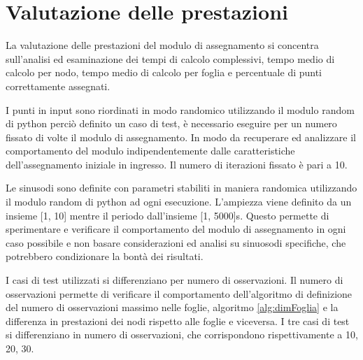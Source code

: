 \documentclass[a4paper,12pt]{report}
\begin{document}
\section{Valutazione delle prestazioni}
La valutazione delle prestazioni del modulo di assegnamento si concentra sull'analisi ed esaminazione dei tempi di calcolo complessivi, tempo medio di calcolo per nodo, tempo medio di calcolo per foglia e percentuale di punti correttamente assegnati.

I punti in input sono riordinati in modo randomico utilizzando il modulo random di python perciò definito un caso di test, è necessario eseguire per un numero fissato di volte il modulo di assegnamento. In modo da recuperare ed analizzare il comportamento del modulo indipendentemente dalle caratteristiche dell'assegnamento iniziale in ingresso. Il numero di iterazioni fissato è pari a 10.

Le sinusodi sono definite con parametri stabiliti in maniera randomica utilizzando il modulo random di python ad ogni esecuzione. L'ampiezza viene definito da un insieme [1, 10] mentre il periodo dall'insieme [1, 5000]s.
Questo permette di sperimentare e verificare il comportamento del modulo di assegnamento in ogni caso possibile e non basare considerazioni ed analisi su sinuosodi specifiche, che potrebbero condizionare la bontà dei risultati.

I  casi di test utilizzati si differenziano per numero di osservazioni. Il numero di osservazioni permette di verificare il comportamento dell'algoritmo di definizione del numero di osservazioni  massimo nelle foglie, algoritmo \ref{alg:dimFoglia} e la differenza in prestazioni dei nodi rispetto alle foglie e viceversa.
I tre casi di test si differenziano in numero di osservazioni, che corrispondono rispettivamente a 10, 20, 30.
\end{document}
